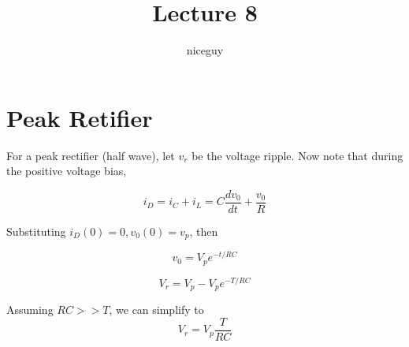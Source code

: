 \documentclass[12pt]{article}
\title{Lecture 8}
\author{niceguy}
\begin{document}
\maketitle

\section{Peak Retifier}

For a peak rectifier (half wave), let $v_r$ be the voltage ripple. Now note that during the positive voltage bias,

$$i_D = i_C + i_L = C\frac{dv_0}{dt} + \frac{v_0}{R}$$

Substituting $i_D(0) = 0, v_0(0) = v_p$, then

$$v_0 = V_pe^{-t/RC}$$

$$V_r = V_p - V_pe^{-T/RC}$$

Assuming $RC >>T$, we can simplify to
$$V_r = V_p\frac{T}{RC}$$
\end{document}

